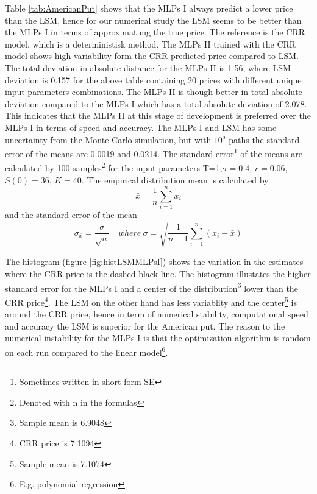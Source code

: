 Table \ref{tab:AmericanPut} shows that the MLPs I always predict a lower price than the LSM, hence for our numerical study the LSM seems to be better than the MLPs I in terms of approximatung the true price. The reference is the CRR model, which is a deterministisk method. The MLPs II trained with the CRR model shows high variability form the CRR predicted price compared to LSM. The total deviation in absolute distance for the MLPs II is 1.56, where LSM deviation is 0.157 for the above table containing 20 prices with different unique input parameters combinations. The MLPs II is though better in total absolute deviation compared to the MLPs I which has a total absolute deviation of 2.078. This indicates that the MLPs II at this stage of development is preferred over the MLPs I in terms of speed and accuracy. The MLPs I and LSM has some uncertainty from the Monte Carlo simulation, but with $10^5$ paths the standard error of the means are 0.0019 and 0.0214. The standard error\footnote{Sometimes written in short form SE} of the means are calculated by 100 samples\footnote{Denoted with n in the formulas} for the input parameters T=1,$\sigma=0.4$, $r=0.06$, $S(0)=36$, $K=40$. The empirical distribution mean is calculated by
$$\bar{x}= \frac{1}{n}\sum_{i=1}^{n} x_i$$
and the standard error of the mean
$$\sigma_{\bar{x}}= \frac{\sigma}{\sqrt{n}} \quad where \ \sigma=\sqrt{\frac{1}{n-1}\sum_{i=1}^{n} (x_i-\bar{x})}$$
 
The histogram (figure \ref{fig:histLSMMLPsI}) shows the variation in the estimates where the CRR price is the dashed black line. The histogram illustates the higher standard error for the MLPs I and a center of the distribution\footnote{Sample mean is 6.9048} lower than the CRR price\footnote{CRR price is 7.1094}. The LSM on the other hand has less variablity and the center\footnote{Sample mean is 7.1074} is around the CRR price, hence in term of numerical stability, computational speed and accuracy the LSM is superior for the American put. The reason to the numerical instability for the MLPs I is that the optimization algorithm is random on each run compared to the linear model\footnote{E.g. polynomial regression}.\\

